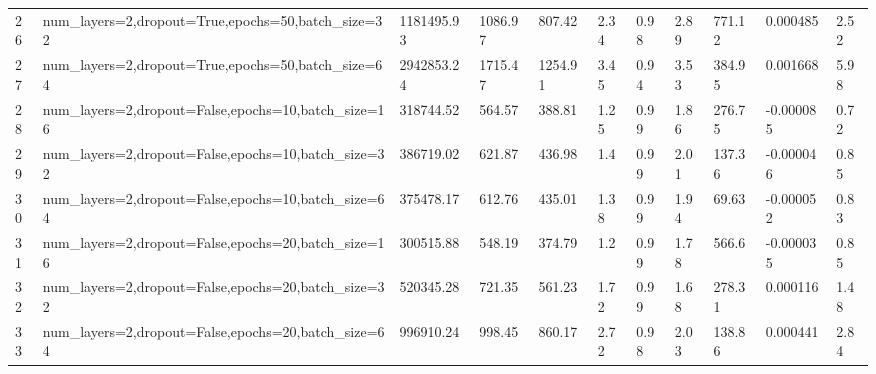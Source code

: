 \begin{longtable}{C{0.8cm} L{2cm} C{1.15cm} C{1.15cm} C{1.15cm} C{1.15cm} C{0.85cm} C{1.25cm} C{1.2cm} C{1.5cm} C{1.0cm}}
26 & num\_layers=2,\newline dropout=True,\newline epochs=50,\newline batch\_size=32 & 1181495.93 & 1086.97 & 807.42 & 2.34 & 0.98 & 2.89 & 771.12 & 0.000485 & 2.52 \\
27 & num\_layers=2,\newline dropout=True,\newline epochs=50,\newline batch\_size=64 & 2942853.24 & 1715.47 & 1254.91 & 3.45 & 0.94 & 3.53 & 384.95 & 0.001668 & 5.98 \\
28 & num\_layers=2,\newline dropout=False,\newline epochs=10,\newline batch\_size=16 & 318744.52 & 564.57 & 388.81 & 1.25 & 0.99 & 1.86 & 276.75 & -0.000085 & 0.72 \\
29 & num\_layers=2,\newline dropout=False,\newline epochs=10,\newline batch\_size=32 & 386719.02 & 621.87 & 436.98 & 1.4 & 0.99 & 2.01 & 137.36 & -0.000046 & 0.85 \\
30 & num\_layers=2,\newline dropout=False,\newline epochs=10,\newline batch\_size=64 & 375478.17 & 612.76 & 435.01 & 1.38 & 0.99 & 1.94 & 69.63 & -0.000052 & 0.83 \\
31 & num\_layers=2,\newline dropout=False,\newline epochs=20,\newline batch\_size=16 & 300515.88 & 548.19 & 374.79 & 1.2 & 0.99 & 1.78 & 566.6 & -0.000035 & 0.85 \\
32 & num\_layers=2,\newline dropout=False,\newline epochs=20,\newline batch\_size=32 & 520345.28 & 721.35 & 561.23 & 1.72 & 0.99 & 1.68 & 278.31 & 0.000116 & 1.48 \\
33 & num\_layers=2,\newline dropout=False,\newline epochs=20,\newline batch\_size=64 & 996910.24 & 998.45 & 860.17 & 2.72 & 0.98 & 2.03 & 138.86 & 0.000441 & 2.84 \\

\end{longtable}
